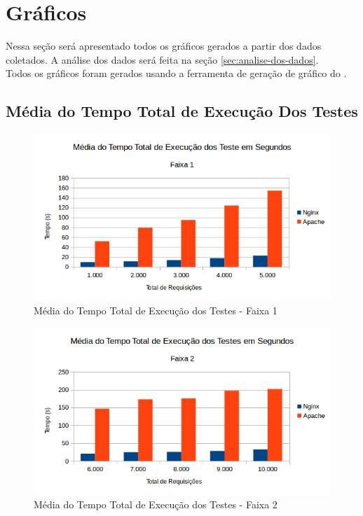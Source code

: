 \section{Gráficos}
Nessa seção será apresentado todos os gráficos gerados a partir dos dados 
coletados. A análise dos dados será feita na seção 
\ref{sec:analise-dos-dados}.\\
Todos os gráficos foram gerados usando a ferramenta de geração de gráfico do 
.
\subsection{Média do Tempo Total de Execução Dos Testes}

\begin{figure}[H]
	\centering
	\includegraphics[width=1\linewidth]{graficos/grafico1-f1} 
	\caption{Média do Tempo Total de Execução dos Testes - Faixa 1}
	\label{fig:grafico1-f1}
\end{figure}

\begin{figure}[H]
	\centering
	\includegraphics[width=1\linewidth]{graficos/grafico1-f2} 
	\caption{Média do Tempo Total de Execução dos Testes - Faixa 2}
	\label{fig:grafico1-f2}
\end{figure}

